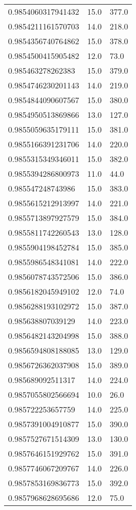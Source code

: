\begin{center}
\begin{supertabular}[H]{p{0.30\textwidth}p{0.05\textwidth}p{0.05\textwidth}}
0.9854060317941432 & 15.0 & 377.0 \\ 
0.9854211161570703 & 14.0 & 218.0 \\ 
0.9854356740764862 & 15.0 & 378.0 \\ 
0.9854500415905482 & 12.0 & 73.0 \\ 
0.985463278262383 & 15.0 & 379.0 \\ 
0.9854746230201143 & 14.0 & 219.0 \\ 
0.9854844090607567 & 15.0 & 380.0 \\ 
0.9854950513869866 & 13.0 & 127.0 \\ 
0.9855059635179111 & 15.0 & 381.0 \\ 
0.9855166391231706 & 14.0 & 220.0 \\ 
0.9855315349346011 & 15.0 & 382.0 \\ 
0.9855394286800973 & 11.0 & 44.0 \\ 
0.985547248743986 & 15.0 & 383.0 \\ 
0.9855615212913997 & 14.0 & 221.0 \\ 
0.9855713897927579 & 15.0 & 384.0 \\ 
0.9855811742260543 & 13.0 & 128.0 \\ 
0.9855904198452784 & 15.0 & 385.0 \\ 
0.9855986548341081 & 14.0 & 222.0 \\ 
0.9856078743572506 & 15.0 & 386.0 \\ 
0.9856182045949102 & 12.0 & 74.0 \\ 
0.9856288193102972 & 15.0 & 387.0 \\ 
0.985638807039129 & 14.0 & 223.0 \\ 
0.9856482143204998 & 15.0 & 388.0 \\ 
0.9856594808188085 & 13.0 & 129.0 \\ 
0.9856726362037908 & 15.0 & 389.0 \\ 
0.985689092511317 & 14.0 & 224.0 \\ 
0.9857055802566694 & 10.0 & 26.0 \\ 
0.985722253657759 & 14.0 & 225.0 \\ 
0.9857391004910877 & 15.0 & 390.0 \\ 
0.9857527671514309 & 13.0 & 130.0 \\ 
0.9857646151929762 & 15.0 & 391.0 \\ 
0.9857746067209767 & 14.0 & 226.0 \\ 
0.9857853169836773 & 15.0 & 392.0 \\ 
0.9857968628695686 & 12.0 & 75.0 \\ 

\end{supertabular}
\end{center}
